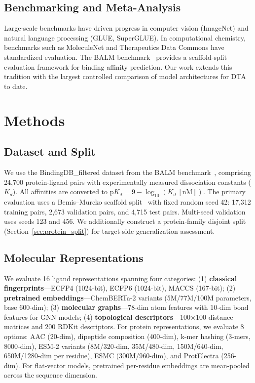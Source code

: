 \documentclass[11pt,twocolumn,a4paper]{article}
\begin{document}
\subsection{Benchmarking and Meta-Analysis}

Large-scale benchmarks have driven progress in computer vision (ImageNet) and natural language processing (GLUE, SuperGLUE). In computational chemistry, benchmarks such as MoleculeNet and Therapeutics Data Commons have standardized evaluation. The BALM benchmark~\cite{balm2024} provides a scaffold-split evaluation framework for binding affinity prediction. Our work extends this tradition with the largest controlled comparison of model architectures for DTA to date.

\section{Methods}

\subsection{Dataset and Split}

We use the BindingDB\_filtered dataset from the BALM benchmark~\cite{balm2024}, comprising 24,700 protein-ligand pairs with experimentally measured dissociation constants ($K_d$). All affinities are converted to $\text{p}K_d = 9 - \log_{10}(K_d\ [\text{nM}])$. The primary evaluation uses a Bemis--Murcko scaffold split~\cite{bemis1996murcko} with fixed random seed 42: 17,312 training pairs, 2,673 validation pairs, and 4,715 test pairs. Multi-seed validation uses seeds 123 and 456. We additionally construct a protein-family disjoint split (Section~\ref{sec:protein_split}) for target-side generalization assessment.

\subsection{Molecular Representations}

We evaluate 16 ligand representations spanning four categories: (1) \textbf{classical fingerprints}---ECFP4 (1024-bit), ECFP6 (1024-bit), MACCS (167-bit); (2) \textbf{pretrained embeddings}---ChemBERTa-2 variants (5M/77M/100M parameters, base 600-dim); (3) \textbf{molecular graphs}---78-dim atom features with 10-dim bond features for GNN models; (4) \textbf{topological descriptors}---100$\times$100 distance matrices and 200 RDKit descriptors. For protein representations, we evaluate 8 options: AAC (20-dim), dipeptide composition (400-dim), k-mer hashing (3-mers, 8000-dim), ESM-2 variants (8M/320-dim, 35M/480-dim, 150M/640-dim, 650M/1280-dim per residue), ESMC (300M/960-dim), and ProtElectra (256-dim). For flat-vector models, pretrained per-residue embeddings are mean-pooled across the sequence dimension.
\end{document}
